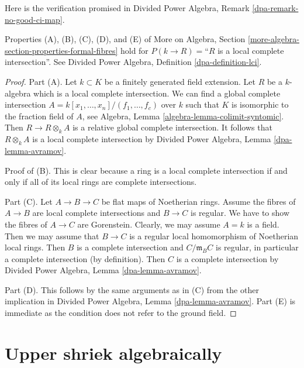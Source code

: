 \noindent
Here is the verification promised in
Divided Power Algebra, Remark \ref{dpa-remark-no-good-ci-map}.

\begin{lemma}
\label{lemma-formal-fibres-lci}
Properties (A), (B), (C), (D), and (E) of
More on Algebra, Section \ref{more-algebra-section-properties-formal-fibres}
hold for $P(k \to R) =$``$R$ is a local complete intersection''.
See Divided Power Algebra, Definition \ref{dpa-definition-lci}.
\end{lemma}

\begin{proof}
Part (A). Let $k \subset K$ be a finitely generated field extension.
Let $R$ be a $k$-algebra which is a local complete intersection.
We can find a global complete intersection
$A = k[x_1, \ldots, x_n]/(f_1, \ldots, f_c)$
over $k$ such that $K$ is isomorphic to the fraction field of $A$, see
Algebra, Lemma \ref{algebra-lemma-colimit-syntomic}.
Then $R \to R \otimes_k A$ is a relative global complete intersection.
It follows that $R \otimes_k A$ is a local complete intersection
by Divided Power Algebra, Lemma \ref{dpa-lemma-avramov}.

\medskip\noindent
Proof of (B). This is clear
because a ring is a local complete intersection if and only if all of its
local rings are complete intersections.

\medskip\noindent
Part (C). Let $A \to B \to C$ be flat maps of Noetherian rings.
Assume the fibres of $A \to B$ are local complete intersections
and $B \to C$ is regular. We have to show the fibres of $A \to C$
are Gorenstein. Clearly, we may assume $A = k$ is a field.
Then we may assume that $B \to C$ is a regular local homomorphism
of Noetherian local rings. Then $B$ is a complete intersection and
$C/\mathfrak m_B C$ is regular, in particular a complete intersection
(by definition). Then $C$ is a complete intersection by
Divided Power Algebra, Lemma \ref{dpa-lemma-avramov}.

\medskip\noindent
Part (D). This follows by the same arguments as in (C) from
the other implication in
Divided Power Algebra, Lemma \ref{dpa-lemma-avramov}.
Part (E) is immediate as the condition does not refer to the ground
field.
\end{proof}






\section{Upper shriek algebraically}
\label{section-relative-dualizing-complex-algebraic}

